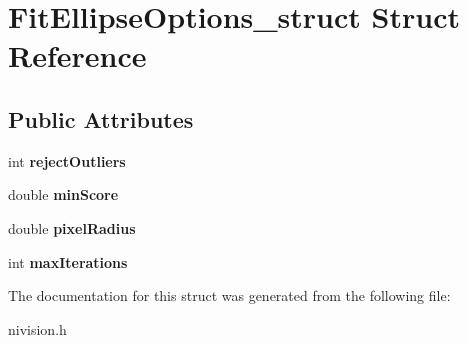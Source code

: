\hypertarget{structFitEllipseOptions__struct}{\section{\-Fit\-Ellipse\-Options\-\_\-struct \-Struct \-Reference}
\label{structFitEllipseOptions__struct}
}
\subsection*{\-Public \-Attributes}
\begin{DoxyCompactItemize}
\item 
\hypertarget{structFitEllipseOptions__struct_a67d79a730b0536924c952515b296b959}{int {\bfseries reject\-Outliers}}\label{structFitEllipseOptions__struct_a67d79a730b0536924c952515b296b959}

\item 
\hypertarget{structFitEllipseOptions__struct_ac8f3c8f981a94dcd6b37c2bab3ebfe4c}{double {\bfseries min\-Score}}\label{structFitEllipseOptions__struct_ac8f3c8f981a94dcd6b37c2bab3ebfe4c}

\item 
\hypertarget{structFitEllipseOptions__struct_a21ec7d69ceefa36bf73b4e5ddb3ad6cd}{double {\bfseries pixel\-Radius}}\label{structFitEllipseOptions__struct_a21ec7d69ceefa36bf73b4e5ddb3ad6cd}

\item 
\hypertarget{structFitEllipseOptions__struct_a406e34d5a6168d16e89f04fe80e6e3fa}{int {\bfseries max\-Iterations}}\label{structFitEllipseOptions__struct_a406e34d5a6168d16e89f04fe80e6e3fa}

\end{DoxyCompactItemize}


\-The documentation for this struct was generated from the following file\-:\begin{DoxyCompactItemize}
\item 
nivision.\-h\end{DoxyCompactItemize}
